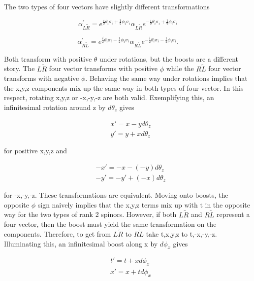 The two types of four vectors have slightly different transformations

\begin{equation}
\alpha_{L\tilde{R}}^{'} = e^{\frac{i}{2}\theta_i \sigma_i + \frac{1}{2}\phi_i \sigma_i} 
\alpha_{L\tilde{R}} e^{-\frac{i}{2}\theta_i \sigma_i + \frac{1}{2}\phi_i \sigma_i}
\end{equation}

\begin{equation}
\alpha_{R\tilde{L}}^{'} = e^{\frac{i}{2}\theta_i \sigma_i - \frac{1}{2}\phi_i \sigma_i} 
\alpha_{R\tilde{L}} e^{-\frac{i}{2}\theta_i \sigma_i - \frac{1}{2}\phi_i \sigma_i}.
\end{equation}

Both transform with positive $\theta$ under rotations, but the boosts are a different story. The $L\tilde{R}$ four vector transforms with positive $\phi$ while the $R\tilde{L}$ four vector transforms with negative $\phi$. Behaving the same way under rotations implies that the x,y,z components mix up the same way in both types of four vector. In this respect, rotating x,y,z or -x,-y,-z are both valid. Exemplifying this, an infinitesimal rotation around z by $d\theta_z$ gives 

\begin{equation}
\begin{split}
&x' = x - yd\theta_z \\
&y' = y + xd\theta_z
\end{split}
\end{equation}

for positive x,y,z and 

\begin{equation}
\begin{split}
&-x' = -x - (-y)d\theta_z \\
&-y' = -y' + (-x)d\theta_z
\end{split}
\end{equation}

for -x,-y,-z. These transformations are equivalent. Moving onto boosts, the opposite $\phi$ sign naively implies that the x,y,z terms mix up with t in the opposite way for the two types of rank 2 spinors. However, if both $L\tilde{R}$ and $R\tilde{L}$ represent a four vector, then the boost must yield the same transformation on the components. Therefore, to get from $L\tilde{R}$ to $R\tilde{L}$ take t,x,y,z to t,-x,-y,-z. Illuminating this, an infinitesimal boost along x by $d\phi_x$ gives 

\begin{equation}
\begin{split}
&t' = t + xd\phi_x \\
&x' = x + td\phi_x 
\end{split}
\end{equation}

